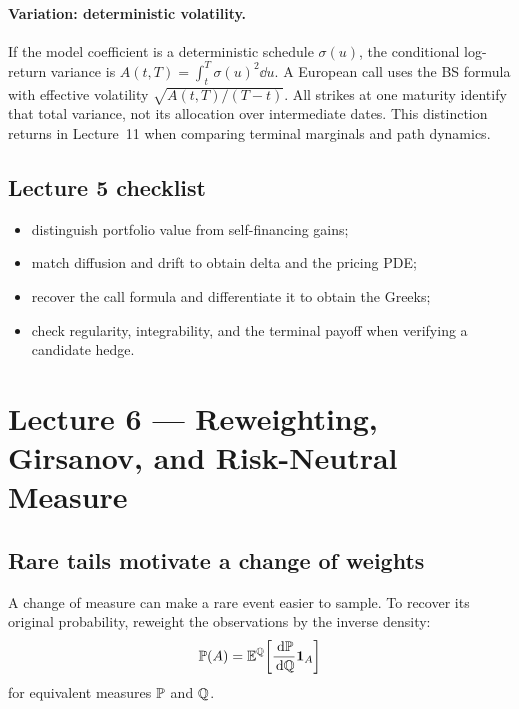 \paragraph{Variation: deterministic volatility.}
If the model coefficient is a deterministic schedule \(\sigma(u)\), the
conditional log-return variance is \(A(t,T)=\int_t^T\sigma(u)^2\dd u\).
A European call uses the BS formula with effective volatility
\(\sqrt{A(t,T)/(T-t)}\). All strikes at one maturity identify that total
variance, not its allocation over intermediate dates. This distinction
returns in Lecture~11 when comparing terminal marginals and path dynamics.

\subsection*{Lecture 5 checklist}
\begin{itemize}[leftmargin=1.5em,itemsep=0.15em]
  \item distinguish portfolio value from self-financing gains;
  \item match diffusion and drift to obtain delta and the pricing PDE;
  \item recover the call formula and differentiate it to obtain the Greeks;
  \item check regularity, integrability, and the terminal payoff when
        verifying a candidate hedge.
\end{itemize}

\section{Lecture 6 --- Reweighting, Girsanov, and Risk-Neutral Measure}


\subsection{Rare tails motivate a change of weights}

A change of measure can make a rare event easier to sample. To recover
its original probability, reweight the observations by the inverse density:
\[
\mathbb{P}(A)=\mathbb{E}^{\mathbb{Q}}\!\left[
\frac{\,\mathrm{d}\mathbb{P}}{\,\mathrm{d}\mathbb{Q}}\mathbf1_A\right]
\]
for equivalent measures \(\mathbb{P}\) and \(\mathbb{Q}\).

